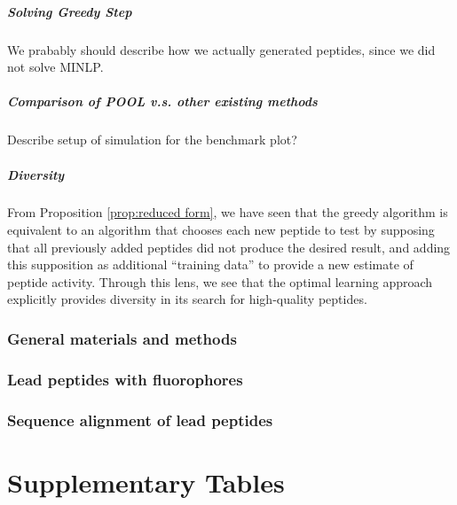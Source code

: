 \documentclass[11pt]{article}
\begin{document}
\subsubsection{Solving Greedy Step}
We prabably should describe how we actually generated peptides, since we did not solve MINLP.

\subsubsection{Comparison of POOL v.s. other existing methods}
Describe setup of simulation for the benchmark plot?

\subsubsection{Diversity}
From Proposition \ref{prop:reduced form}, we have seen that the greedy algorithm
is equivalent to an algorithm that chooses each new peptide to test by supposing
that all previously added peptides did not produce the desired result, and adding
this supposition as additional \enquote{training data} to provide a new estimate
of peptide activity. Through this lens, we see that the optimal learning approach
explicitly provides diversity in its search for high-quality peptides.

\section{General materials and methods}
\section{Lead peptides with fluorophores}
\section{Sequence alignment of lead peptides}
\part{Supplementary Tables}



\end{document}
